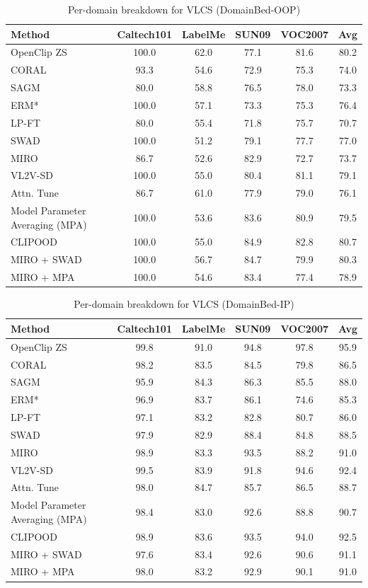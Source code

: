 \documentclass{article} %
\begin{document}
\begin{table}[t]
\small
\centering
\caption{Per-domain breakdown for VLCS (DomainBed-OOP)}
\begin{tabular}{lccccc}
\toprule
\textbf{Method} & Caltech101 & LabelMe & SUN09 & VOC2007 & Avg \\ \midrule
OpenClip ZS & 100.0 &62.0 & 77.1  & 81.6 & 80.2 \\
\midrule
CORAL & 93.3 & 54.6 & 72.9 & 75.3 & 74.0 \\ 
SAGM & 80.0 & 58.8 & 76.5 & 78.0 & 73.3 \\ 
ERM* & 100.0 & 57.1 & 73.3 & 75.3 & 76.4 \\ 
LP-FT & 80.0 & 55.4 & 71.8 & 75.7 & 70.7 \\ 
SWAD & 100.0 & 51.2 & 79.1 & 77.7 & 77.0 \\
MIRO & 86.7 & 52.6 & 82.9 & 72.7 & 73.7 \\ 
VL2V-SD & 100.0 & 55.0 & 80.4 & 81.1 & 79.1 \\ 
Attn. Tune & 86.7 & 61.0 & 77.9 & 79.0 & 76.1 \\ 
Model Parameter Averaging (MPA) & 100.0 & 53.6 & 83.6 & 80.9 & 79.5 \\ 
CLIPOOD & 100.0  & 55.0 & 84.9 & 82.8  & 80.7\\\hline
MIRO + SWAD & 100.0 & 56.7 & 84.7 & 79.9 & 80.3 \\ 
MIRO + MPA & 100.0 & 54.6 & 83.4 & 77.4 & 78.9 \\ 
\bottomrule
\end{tabular}
\label{table:VLCS OOP}
\end{table}


\begin{table}[t]
\small
\centering
\caption{Per-domain breakdown for VLCS (DomainBed-IP)}
\begin{tabular}{lccccc}
\toprule
\textbf{Method} & Caltech101 & LabelMe & SUN09 & VOC2007 & Avg \\ \midrule
OpenClip ZS & 99.8 & 91.0 & 94.8 & 97.8 & 95.9 \\
\midrule
CORAL & 98.2 & 83.5 & 84.5 & 79.8 & 86.5 \\
SAGM & 95.9 & 84.3 & 86.3 & 85.5 & 88.0 \\ 
ERM* & 96.9 & 83.7 & 86.1 & 74.6 & 85.3 \\ 
LP-FT & 97.1 & 83.2 & 82.8 & 80.7 & 86.0 \\ 
SWAD & 97.9 & 82.9 & 88.4 & 84.8 & 88.5 \\ 
MIRO & 98.9 & 83.3 & 93.5 & 88.2 & 91.0 \\ 
VL2V-SD & 99.5 & 83.9 & 91.8 & 94.6 & 92.4 \\ 
Attn. Tune & 98.0 & 84.7 & 85.7 & 86.5 & 88.7 \\ 
Model Parameter Averaging (MPA) & 98.4 & 83.0 & 92.6 & 88.8 & 90.7 \\ 
CLIPOOD & 98.9  & 83.6  &  93.5  & 94.0 & 92.5 \\\hline
MIRO + SWAD & 97.6 & 83.4 & 92.6 & 90.6 & 91.1 \\ 
MIRO + MPA & 98.0 & 83.2 & 92.9 & 90.1 & 91.0 \\ 
\bottomrule
\end{tabular}
\label{table:VLCS IP}
\end{table}
\end{document}
